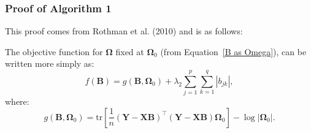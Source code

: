 \documentclass[11pt]{report} %
\begin{document}
\subsubsection{Proof of Algorithm 1}
\label{alg 1}
This proof comes from Rothman et al. (2010) and is as follows:

The objective function for $\mathbf{\Omega}$ fixed at $\mathbf{\Omega}_0$ (from Equation~\ref{B as Omega}), can be written more simply as:
\[
f(\mathbf{B}) = g(\mathbf{B}, \mathbf{\Omega}_0) + \lambda_2 \sum_{j=1}^{p} \sum_{k=1}^{q} |b_{jk}|,
\]
where:
\begin{equation*}
    g(\mathbf{B}, \boldsymbol{\Omega}_0) = \text{tr} \left[ \frac{1}{n} (\mathbf{Y} - \mathbf{X} \mathbf{B})^\top (\mathbf{Y} - \mathbf{X} \mathbf{B}) \boldsymbol{\Omega}_0 \right] - \log |\boldsymbol{\Omega}_0|.
\end{equation*}
\end{document}
